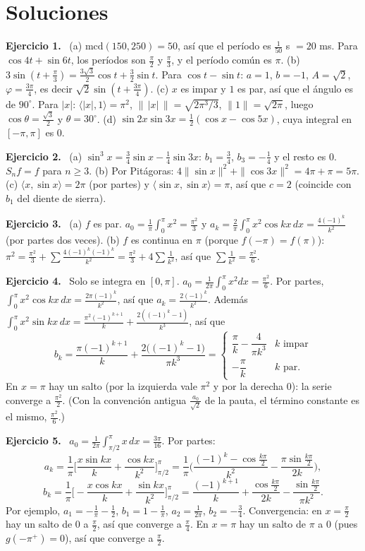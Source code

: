 \documentclass[11pt,a4paper]{article}
\newcommand{\sol}[1]{\par\medskip\noindent\textbf{Ejercicio #1.}\ }
\begin{document}
\newpage
\section{Soluciones}

\sol{1}
(a) $\mathrm{mcd}(150,250)=50$, así que el período es $\frac1{50}$ s $=20$ ms. Para $\cos4t+\sin6t$, los períodos son $\frac\pi2$ y $\frac\pi3$, y el período común es $\pi$.
(b) $3\sin(t+\frac\pi3)=\frac{3\sqrt3}2\cos t+\frac32\sin t$. Para $\cos t-\sin t$: $a=1$, $b=-1$, $A=\sqrt2$, $\varphi=\frac{3\pi}4$, es decir $\sqrt2\sin(t+\frac{3\pi}4)$.
(c) $x$ es impar y $1$ es par, así que el ángulo es de $90^\circ$. Para $|x|$: $\langle|x|,1\rangle=\pi^2$, $\|\,|x|\,\|=\sqrt{2\pi^3/3}$, $\|1\|=\sqrt{2\pi}$, luego $\cos\theta=\frac{\sqrt3}2$ y $\theta=30^\circ$.
(d) $\sin2x\sin3x=\frac12(\cos x-\cos5x)$, cuya integral en $[-\pi,\pi]$ es $0$.

\sol{2}
(a) $\sin^3x=\frac34\sin x-\frac14\sin3x$: $b_1=\frac34$, $b_3=-\frac14$ y el resto es $0$. $S_nf=f$ para $n\ge3$.
(b) Por Pitágoras: $4\|\sin x\|^2+\|\cos3x\|^2=4\pi+\pi=5\pi$.
(c) $\langle x,\sin x\rangle=2\pi$ (por partes) y $\langle\sin x,\sin x\rangle=\pi$, así que $c=2$ (coincide con $b_1$ del diente de sierra).

\sol{3}
(a) $f$ es par. $a_0=\frac1\pi\int_0^\pi x^2=\frac{\pi^2}3$ y $a_k=\frac2\pi\int_0^\pi x^2\cos kx\,dx=\frac{4(-1)^k}{k^2}$ (por partes dos veces).
(b) $f$ es continua en $\pi$ (porque $f(-\pi)=f(\pi)$): $\pi^2=\frac{\pi^2}3+\sum\frac{4(-1)^k(-1)^k}{k^2}=\frac{\pi^2}3+4\sum\frac1{k^2}$, así que $\sum\frac1{k^2}=\frac{\pi^2}6$.

\sol{4}
Solo se integra en $[0,\pi]$. $a_0=\frac1{2\pi}\int_0^\pi x^2dx=\frac{\pi^2}6$.
Por partes, $\int_0^\pi x^2\cos kx\,dx=\frac{2\pi(-1)^k}{k^2}$, así que $a_k=\frac{2(-1)^k}{k^2}$.
Además $\int_0^\pi x^2\sin kx\,dx=\frac{\pi^2(-1)^{k+1}}k+\frac{2((-1)^k-1)}{k^3}$, así que
\[
b_k=\frac{\pi(-1)^{k+1}}{k}+\frac{2\big((-1)^k-1\big)}{\pi k^3}=\begin{cases}\dfrac\pi k-\dfrac4{\pi k^3}&k\text{ impar}\\[6pt]-\dfrac\pi k&k\text{ par.}\end{cases}
\]
En $x=\pi$ hay un salto (por la izquierda vale $\pi^2$ y por la derecha $0$): la serie converge a $\frac{\pi^2}2$.
(Con la convención antigua $\frac{a_0}{\sqrt2}$ de la pauta, el término constante es el mismo, $\frac{\pi^2}6$.)

\sol{5}
$a_0=\frac1{2\pi}\int_{\pi/2}^\pi x\,dx=\frac{3\pi}{16}$. Por partes:
\[
a_k=\frac1\pi\Big[\frac{x\sin kx}k+\frac{\cos kx}{k^2}\Big]_{\pi/2}^{\pi}=\frac1\pi\Big(\frac{(-1)^k-\cos\frac{k\pi}2}{k^2}-\frac{\pi\sin\frac{k\pi}2}{2k}\Big),
\]
\[
b_k=\frac1\pi\Big[-\frac{x\cos kx}k+\frac{\sin kx}{k^2}\Big]_{\pi/2}^{\pi}=\frac{(-1)^{k+1}}k+\frac{\cos\frac{k\pi}2}{2k}-\frac{\sin\frac{k\pi}2}{\pi k^2}.
\]
Por ejemplo, $a_1=-\frac1\pi-\frac12$, $b_1=1-\frac1\pi$, $a_2=\frac1{2\pi}$, $b_2=-\frac34$.
Convergencia: en $x=\frac\pi2$ hay un salto de $0$ a $\frac\pi2$, así que converge a $\frac\pi4$. En $x=\pi$ hay un salto de $\pi$ a $0$ (pues $g(-\pi^+)=0$), así que converge a $\frac\pi2$.
\end{document}

